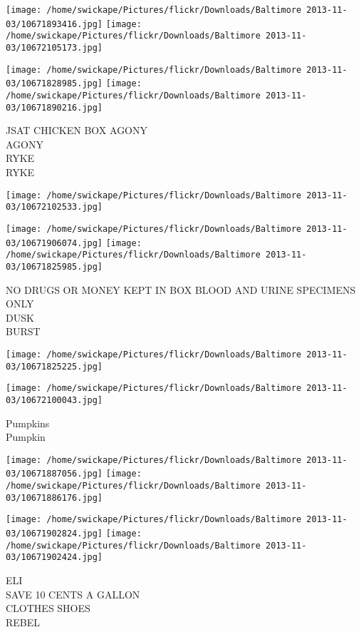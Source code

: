 \documentclass[10pt,letterpaper]{article}
\begin{document}
\texttt{[image: /home/swickape/Pictures/flickr/Downloads/Baltimore 2013-11-03/10671893416.jpg]}
\texttt{[image: /home/swickape/Pictures/flickr/Downloads/Baltimore 2013-11-03/10672105173.jpg]}

\texttt{[image: /home/swickape/Pictures/flickr/Downloads/Baltimore 2013-11-03/10671828985.jpg]}
\texttt{[image: /home/swickape/Pictures/flickr/Downloads/Baltimore 2013-11-03/10671890216.jpg]}

JSAT CHICKEN BOX AGONY\\
AGONY\\
RYKE\\
RYKE\\
\pagebreak

\texttt{[image: /home/swickape/Pictures/flickr/Downloads/Baltimore 2013-11-03/10672102533.jpg]}

\vspace{0.25in}
\texttt{[image: /home/swickape/Pictures/flickr/Downloads/Baltimore 2013-11-03/10671906074.jpg]}
\texttt{[image: /home/swickape/Pictures/flickr/Downloads/Baltimore 2013-11-03/10671825985.jpg]}

NO DRUGS OR MONEY KEPT IN BOX BLOOD AND URINE SPECIMENS ONLY\\
DUSK\\
BURST\\
\pagebreak

\texttt{[image: /home/swickape/Pictures/flickr/Downloads/Baltimore 2013-11-03/10671825225.jpg]}

\vspace{0.25in}
\texttt{[image: /home/swickape/Pictures/flickr/Downloads/Baltimore 2013-11-03/10672100043.jpg]}

Pumpkins\\
Pumpkin\\
\pagebreak

\texttt{[image: /home/swickape/Pictures/flickr/Downloads/Baltimore 2013-11-03/10671887056.jpg]}
\texttt{[image: /home/swickape/Pictures/flickr/Downloads/Baltimore 2013-11-03/10671886176.jpg]}

\texttt{[image: /home/swickape/Pictures/flickr/Downloads/Baltimore 2013-11-03/10671902824.jpg]}
\texttt{[image: /home/swickape/Pictures/flickr/Downloads/Baltimore 2013-11-03/10671902424.jpg]}

ELI\\
SAVE 10 CENTS A GALLON\\
CLOTHES SHOES\\
REBEL\\
\pagebreak
\end{document}
